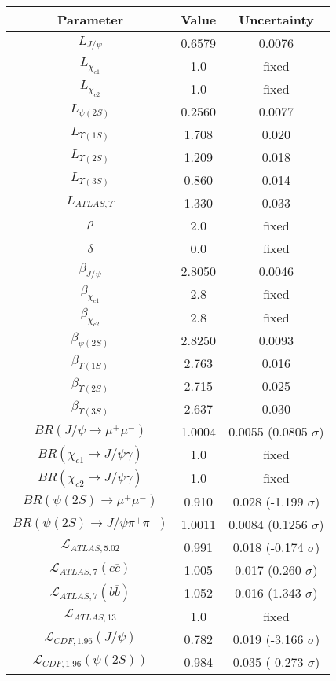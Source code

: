 \begin{table}[h!]
\centering
\begin{tabular}{c|c|c}
Parameter & Value & Uncertainty \\
\hline
$L_{J/\psi}$ & 0.6579 & 0.0076 \\
$L_{\chi_{c1}}$ & 1.0 & fixed \\
$L_{\chi_{c2}}$ & 1.0 & fixed \\
$L_{\psi(2S)}$ & 0.2560 & 0.0077 \\
$L_{\Upsilon(1S)}$ & 1.708 & 0.020 \\
$L_{\Upsilon(2S)}$ & 1.209 & 0.018 \\
$L_{\Upsilon(3S)}$ & 0.860 & 0.014 \\
$L_{ATLAS,\Upsilon}$ & 1.330 & 0.033 \\
$\rho$ & 2.0 & fixed \\
$\delta$ & 0.0 & fixed \\
$\beta_{J/\psi}$ & 2.8050 & 0.0046 \\
$\beta_{\chi_{c1}}$ & 2.8 & fixed \\
$\beta_{\chi_{c2}}$ & 2.8 & fixed \\
$\beta_{\psi(2S)}$ & 2.8250 & 0.0093 \\
$\beta_{\Upsilon(1S)}$ & 2.763 & 0.016 \\
$\beta_{\Upsilon(2S)}$ & 2.715 & 0.025 \\
$\beta_{\Upsilon(3S)}$ & 2.637 & 0.030 \\
$BR(J/\psi\rightarrow\mu^+\mu^-)$ & 1.0004 & 0.0055 (0.0805 $\sigma$) \\
$BR(\chi_{c1}\rightarrow J/\psi\gamma)$ & 1.0 & fixed \\
$BR(\chi_{c2}\rightarrow J/\psi\gamma)$ & 1.0 & fixed \\
$BR(\psi(2S)\rightarrow\mu^+\mu^-)$ & 0.910 & 0.028 (-1.199 $\sigma$) \\
$BR(\psi(2S)\rightarrow J/\psi\pi^+\pi^-)$ & 1.0011 & 0.0084 (0.1256 $\sigma$) \\
$\mathcal L_{ATLAS,5.02}$ & 0.991 & 0.018 (-0.174 $\sigma$) \\
$\mathcal L_{ATLAS,7}(c\overline c)$ & 1.005 & 0.017 (0.260 $\sigma$) \\
$\mathcal L_{ATLAS,7}(b\overline b)$ & 1.052 & 0.016 (1.343 $\sigma$) \\
$\mathcal L_{ATLAS,13}$ & 1.0 & fixed \\
$\mathcal L_{CDF,1.96}(J/\psi)$ & 0.782 & 0.019 (-3.166 $\sigma$) \\
$\mathcal L_{CDF,1.96}(\psi(2S))$ & 0.984 & 0.035 (-0.273 $\sigma$) \\

\end{tabular}
\end{table}
